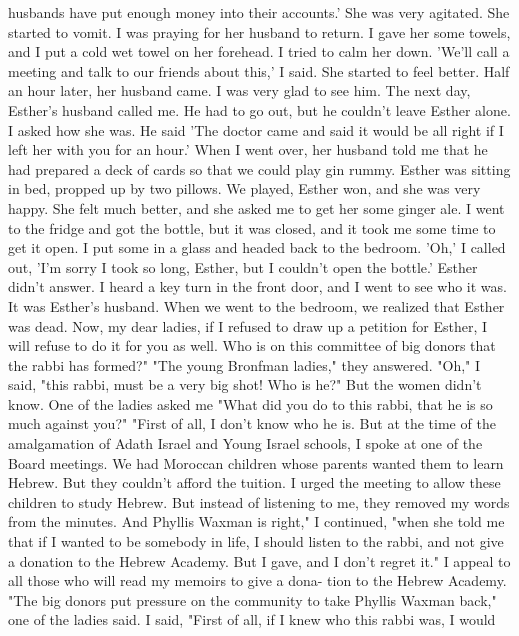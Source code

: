 husbands have put enough money into their accounts.' She was very 
agitated. She started to vomit. I was praying for her husband to 
return. I gave her some towels, and I put a cold wet towel on her 
forehead. I tried to calm her down. 
'We'll call a meeting and talk to our friends about this,' I said. 
She started to feel better. Half an hour later, her husband came.
I was very glad to see him. 
The next day, Esther's husband called me. He had to go out, 
but he couldn't leave Esther alone. I asked how she was. He said 
'The doctor came and said it would be all right if I left her with 
you for an hour.' When I went over, her husband told me that he 
had prepared a deck of cards so that we could play gin rummy. 
Esther was sitting in bed, propped up by two pillows. We played,
Esther won, and she was very happy. She felt much better, and she 
asked me to get her some ginger ale. I went to the fridge and got 
the bottle, but it was closed, and it took me some time to get it 
open. I put some in a glass and headed back to the bedroom. 
'Oh,' I called out, 'I'm sorry I took so long, Esther, but I 
couldn't open the bottle.' Esther didn't answer. I heard a key turn 
in the front door, and I went to see who it was. It was Esther's 
husband. When we went to the bedroom, we realized that Esther was 
dead. 
Now, my dear ladies, if I refused to draw up a petition for 
Esther, I will refuse to do it for you as well. Who is on this 
committee of big donors that the rabbi has formed?" 
"The young Bronfman ladies," they answered. 
"Oh," I said, "this rabbi, must be a very big shot! Who is he?" But the women didn't know. 
One of the ladies asked me "What did you do to this rabbi, 
that he is so much against you?" 
"First of all, I don't know who he is. But at the time of the 
amalgamation of Adath Israel and Young Israel schools, I spoke at 
one of the Board meetings. We had Moroccan children whose parents 
wanted them to learn Hebrew. But they couldn't afford the tuition. 
I urged the meeting to allow these children to study Hebrew. But 
instead of listening to me, they removed my words from the minutes. 
And Phyllis Waxman is right," I continued, "when she told me that 
if I wanted to be somebody in life, I should listen to the rabbi, 
and not give a donation to the Hebrew Academy. But I gave, and I 
don't regret it." 
I appeal to all those who will read my memoirs to give a dona-
tion to the Hebrew Academy. 
"The big donors put pressure on the community to take Phyllis 
Waxman back," one of the ladies said. 
I said, "First of all, if I knew who this rabbi was, I would 

